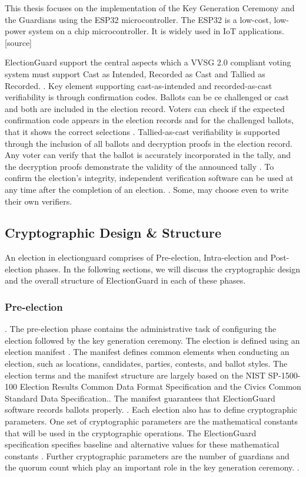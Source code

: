 This thesis focuses on the implementation of the Key Generation Ceremony and the Guardians using the ESP32 microcontroller. The ESP32 is a low-cost, low-power system on a chip microcontroller. It is widely used in IoT applications. [source]

ElectionGuard support the central aspects which a VVSG 2.0 compliant voting system must support Cast as Intended, Recorded as Cast and Tallied as Recorded. \cite[17]{eg-paper}. Key element supporting cast-as-intended and recorded-as-cast verifiability is through confirmation codes. Ballots can be ce challenged or cast and both are included in the election record. Voters can check if the expected confirmation code appears in the election records and for the challenged ballots, that it shows the correct selections \cite[18]{eg-paper}. Tallied-as-cast verifiability is supported through the inclusion of all ballots and decryption proofs in the election record. Any voter can verify that the ballot is accurately incorporated in the tally, and the decryption proofs demonstrate the validity of the announced tally \cite[18]{eg-paper}. To confirm the election's integrity, independent verification software can be used at any time after the completion of an election. \cite[6]{eg-paper}. Some, may choose even to write their own verifiers.  

\subsection{Cryptographic Design & Structure}
An election in electionguard comprises of Pre-election, Intra-election and Post-election phases. In the following sections, we will discuss the cryptographic design and the overall structure of ElectionGuard in each of these phases.

\subsubsection{Pre-election}. 
The pre-election phase contains the administrative task of configuring the election followed by the key generation ceremony. The election is defined using an election manifest \cite[7]{eg-paper}. The manifest defines common elements when conducting an election, such as locations, candidates, parties, contests, and ballot styles. The election terms and the manifest structure are largely based on the NIST SP-1500-100 Election Results Common Data Format Specification and the Civics Common Standard Data Specification.\cite{eg-docs}.  The manifest guarantees that ElectionGuard software records ballots properly. \cite[7]{eg-paper}. Each election also has to define cryptographic parameters. One set of cryptographic parameters are the mathematical constants that will be used in the cryptographic operations. The ElectionGuard specification specifies baseline and alternative values for these mathematical constants \cite[21, 36-38]{eg-spec}. Further cryptographic parameters are the number of guardians and the quorum count which play an important role in the key generation ceremony. \cite[8-9]{eg-paper}.


